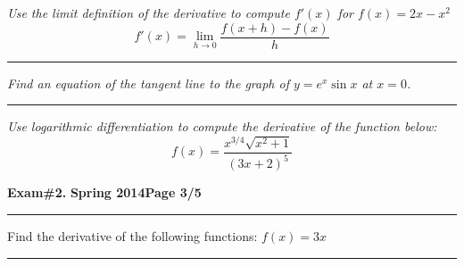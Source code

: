 \documentclass[12pt]{article}
\begin{document}
\bigskip
{\problem[10 pts] \em Use the limit definition of the derivative to
compute $f'(x)$ for $f(x)=2x-x^2$}
\begin{equation*}
f'(x) = \lim_{h \to 0} \frac{ f(x+h)-f(x)}{h}
\end{equation*}
\vspace{2cm}
\begin{flushright}
\end{flushright}
\hrule
{\problem[10 pts] \em Find an equation of the tangent line to the graph
of $y=e^x \sin x$ at $x=0$.}
\vspace{4cm}
\begin{flushright}
\end{flushright}
\hrule
{\problem[10 pts] \em Use logarithmic differentiation to compute the
derivative of the function below:}
\begin{equation*}
f(x) = \frac{x^{3/4} \sqrt{x^2+1}}{(3x+2)^5}
\end{equation*}
\vspace{7cm}
\begin{flushright}
\end{flushright}
\newpage

\hfill{\large\bf Exam\#2.}\hfill{\large\bf
  Spring 2014}\hfill{\large\bf Page 3/5}\hrule

\bigskip
\noindent Find the derivative of the following functions:
{\problem[2 pts] $f(x)=3x$}
\begin{flushright}
\end{flushright}
\hrule
\end{document}

